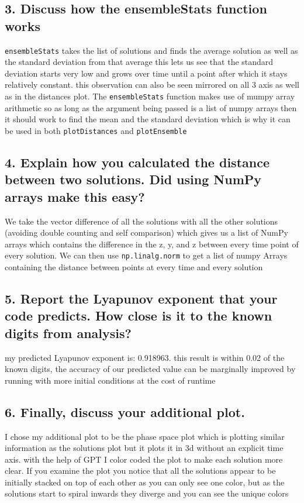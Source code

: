 \documentclass{article}
\begin{document}
\subsection*{3. Discuss how the ensembleStats function works}
\lstinline|ensembleStats| takes the list of solutions and finds the average solution as well as the standard deviation from that average
this lets us see that the standard deviation starts very low and grows over time until a point after which it stays relatively constant.
this observation can also be seen mirrored on all 3 axis as well as in the distances plot. The \lstinline|ensembleStats| function makes use of 
mumpy array arithmetic so as long as the argument being passed is a list of numpy arrays then it should work to find the mean and the standard deviation
which is why it can be used in both \lstinline|plotDistances| and \lstinline|plotEnsemble|

\subsection*{4. Explain how you calculated the distance between two solutions. Did using NumPy arrays make this easy?}
We take the vector difference of all the solutions with all the other solutions (avoiding double counting and self comparison) which gives us a list of NumPy arrays
which contains the difference in the z, y, and z between every time point of every solution. We can then use \lstinline|np.linalg.norm| to get a list of numpy Arrays containing the
distance between points at every time and every solution

\subsection*{5. Report the Lyapunov exponent that your code predicts. How close is it to the known digits from analysis?}
my predicted Lyapunov exponent is: 0.918963. this result is within 0.02 of the known digits, the accuracy of our predicted value can be 
marginally improved by running with more initial conditions at the cost of runtime

\subsection*{6. Finally, discuss your additional plot.}
I chose my additional plot to be the phase space plot which is plotting similar information as the solutions plot but it 
plots it in 3d without an explicit time axis. with the help of GPT I color coded the plot to make each solution more clear. 
If you examine the plot you notice that all the solutions appear to be initially stacked on top of each other 
as you can only see one color, but as the solutions start to spiral inwards they diverge and you can see the unique colors
\end{document}
